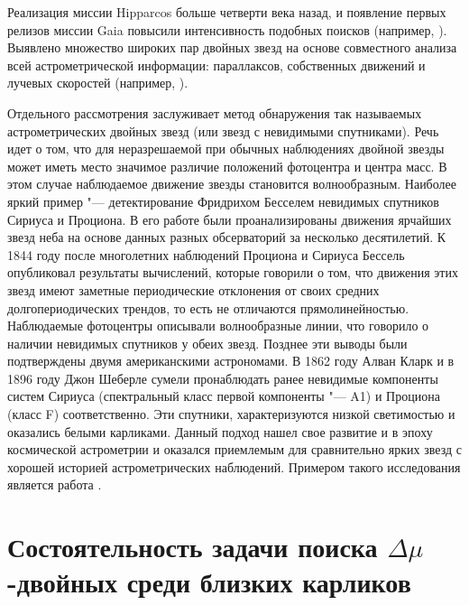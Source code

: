 Реализация миссии Hipparcos больше четверти века назад, и появление первых релизов миссии Gaia повысили интенсивность подобных поисков (например, \cite{2018JDSO...14..367K}). Выявлено множество широких пар двойных звезд на основе совместного анализа всей астрометрической информации: параллаксов, собственных движений и лучевых скоростей (например, \cite{2019A&A...623A..72K}).

Отдельного рассмотрения заслуживает метод обнаружения так называемых астрометрических двойных звезд (или звезд с невидимыми спутниками). Речь идет о том, что для неразрешаемой при обычных наблюдениях двойной звезды может иметь место значимое различие положений фотоцентра и центра масс. В этом случае наблюдаемое движение звезды становится волнообразным. Наиболее яркий пример "--- детектирование Фридрихом Бесселем невидимых спутников Сириуса и Проциона. В его работе были проанализированы движения ярчайших звезд неба на основе данных разных обсерваторий за несколько десятилетий. К 1844 году после многолетних наблюдений Проциона и Сириуса Бессель опубликовал результаты вычислений, которые говорили о том, что движения этих звезд имеют заметные периодические отклонения от своих средних долгопериодических трендов, то есть не отличаются прямолинейностью. Наблюдаемые фотоцентры описывали волнообразные линии, что говорило о наличии невидимых спутников у обеих звезд. Позднее эти выводы были подтверждены двумя американскими астрономами. В 1862 году Алван Кларк и в 1896 году Джон Шеберле сумели пронаблюдать ранее невидимые компоненты систем Сириуса (спектральный класс первой компоненты "--- A1) и Проциона (класс F) соответственно. Эти спутники, характеризуются низкой светимостью и оказались белыми карликами. Данный подход нашел свое развитие и в эпоху космической астрометрии и оказался приемлемым для сравнительно ярких звезд с хорошей историей астрометрических наблюдений. Примером такого исследования является работа \cite{2002A&A...391..647G}.

\section{Состоятельность задачи поиска $\Delta\mu$-двойных среди близких карликов}\label{sec:ch1/sectN2}
